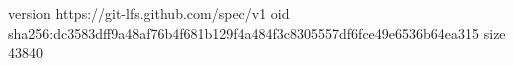 version https://git-lfs.github.com/spec/v1
oid sha256:dc3583dff9a48af76b4f681b129f4a484f3c8305557df6fce49e6536b64ea315
size 43840

